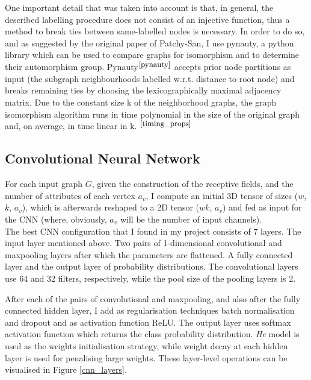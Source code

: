 One important detail that was taken into account is that, in general, the described labelling procedure does not consist of an injective function, thus a method to break ties between same-labelled nodes is necessary. In order to do so, and as suggested by the original paper of Patchy-San, I use pynauty, a python library which can be used to compare graphs for isomorphism and to determine their automorphism group. Pynauty$^{\small \cite{pynauty}}$ accepts prior node partitions as input (the subgraph neighbourhoods labelled w.r.t. distance to root node) and breaks remaining ties by choosing the lexicographically maximal adjacency matrix. Due to the constant size k of the neighborhood graphs, the graph isomorphism algorithm runs in time polynomial in the size of the original graph and, on average, in time linear in k. $^{\small \cite{timing_props}}$ 

\subsection{Convolutional Neural Network}

For each input graph $G$, given the construction of the receptive fields, and the number of attributes of each vertex $a_v$, I compute an initial 3D tensor of sizes ($w$, $k$, $a_v$), which is afterwards reshaped to a 2D tensor ($wk$, $a_v$) and fed as input for the CNN (where, obviously, $a_v$ will be the number of input channels). \\

The best CNN configuration that I found in my project consists of 7 layers. The input layer mentioned above. Two pairs of 1-dimensional convolutional and maxpooling layers after which the parameters are flattened. A fully connected layer and the output layer of probability distributions. The convolutional layers use 64 and 32 filters, respectively, while the pool size of the pooling layers is 2. \smallskip

After each of the pairs of convolutional and maxpooling, and also after the fully connected hidden layer, I add as regularisation techniques batch normalisation and dropout and as activation function ReLU. The output layer uses softmax activation function which returns the class probability distribution. \textit{He} model is used as the weights initialisation strategy, while weight decay at each hidden layer is used for penalising large weights. These layer-level operations can be visualised in Figure \ref{cnn_layers}. 

